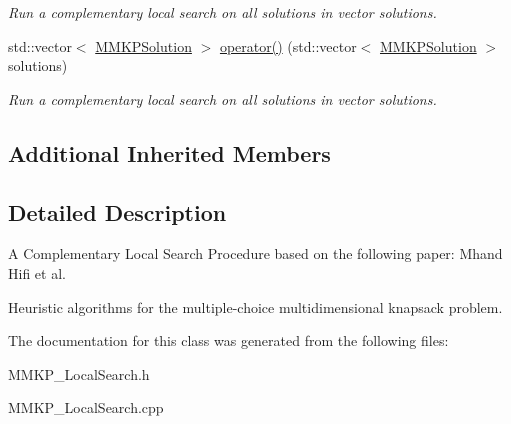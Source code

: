 \begin{DoxyCompactItemize}
\begin{DoxyCompactList}\small\item\em Run a complementary local search on all solutions in vector solutions. \end{DoxyCompactList}\item 
\hypertarget{class_comp_local_search_a5debfa8e13f50eb38c962e3d5502dcdc}{std\+::vector$<$ \hyperlink{class_m_m_k_p_solution}{M\+M\+K\+P\+Solution} $>$ \hyperlink{class_comp_local_search_a5debfa8e13f50eb38c962e3d5502dcdc}{operator()} (std\+::vector$<$ \hyperlink{class_m_m_k_p_solution}{M\+M\+K\+P\+Solution} $>$ solutions)}\label{class_comp_local_search_a5debfa8e13f50eb38c962e3d5502dcdc}

\begin{DoxyCompactList}\small\item\em Run a complementary local search on all solutions in vector solutions. \end{DoxyCompactList}\end{DoxyCompactItemize}
\subsection*{Additional Inherited Members}


\subsection{Detailed Description}
A Complementary Local Search Procedure based on the following paper\+: Mhand Hifi et al. 

Heuristic algorithms for the multiple-\/choice multidimensional knapsack problem. 

The documentation for this class was generated from the following files\+:\begin{DoxyCompactItemize}
\item 
M\+M\+K\+P\+\_\+\+Local\+Search.\+h\item 
M\+M\+K\+P\+\_\+\+Local\+Search.\+cpp\end{DoxyCompactItemize}
